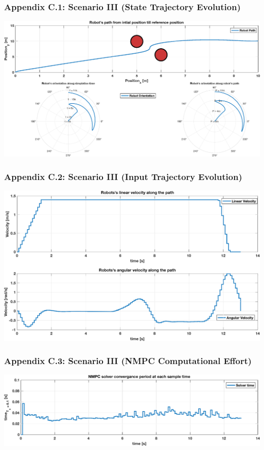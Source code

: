	\begin{frame}
		\frametitle{Appendix C.1: Scenario \textrm{III} (State Trajectory Evolution)}\label{c.1}
		\centering
		\includegraphics[scale=0.44]{pictures/graphs/sn2_states.eps}
	\end{frame}
	
	\begin{frame}
		\frametitle{Appendix C.2: Scenario \textrm{III} (Input Trajectory Evolution)}\label{c.2}
		\centering
		\includegraphics[scale=0.42]{pictures/graphs/sn2_inputs.eps}
	\end{frame}
	
	\begin{frame}
		\frametitle{Appendix C.3: Scenario \textrm{III} (NMPC Computational Effort)}\label{c.3}
		\centering
		\includegraphics[scale=0.42]{pictures/graphs/sn2_solver_time.eps}
	\end{frame}
 
